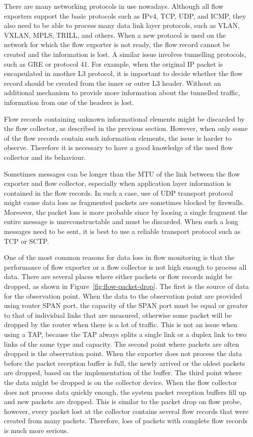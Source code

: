 There are many networking protocols in use nowadays. Although all flow exporters support the basic protocols such as IPv4, TCP, UDP, and ICMP, they also need to be able to process many data link layer protocols, such as VLAN, VXLAN, MPLS, TRILL, and others. When a new protocol is used on the network for which the flow exporter is not ready, the flow record cannot be created and the information is lost. A similar issue involves tunnelling protocols, such as GRE or protocol 41. For example, when the original IP packet is encapsulated in another L3 protocol, it is important to decide whether the flow record should be created from the inner or outer L3 header. Without an additional mechanism to provide more information about the tunnelled traffic, information from one of the headers is lost.

Flow records containing unknown informational elements might be discarded by the flow collector, as described in the previous section. However, when only some of the flow records contain such information elements, the issue is harder to observe. Therefore it is necessary to have a good knowledge of the used flow collector and its behaviour.

Sometimes messages can be longer than the MTU of the link between the flow exporter and flow collector, especially when application layer information is contained in the flow records. In such a case, use of UDP transport protocol might cause data loss as fragmented packets are sometimes blocked by firewalls. Moreover, the packet loss is more probable since by loosing a single fragment the entire message is unreconstructable and must be discarded. When such a long messages need to be sent, it is best to use a reliable transport protocol such as TCP or SCTP.

One of the most common reasons for data loss in flow monitoring is that the performance of flow exporter or a flow collector is not high enough to process all data. There are several places where either packets or flow records might be dropped, as shown in Figure~\ref{fig:flow-packet-drop}. The first is the source of data for the observation point. When the data to the observation point are provided using router SPAN port, the capacity of the SPAN port must be equal or greater to that of individual links that are measured, otherwise some packet will be dropped by the router when there is a lot of traffic. This is not an issue when using a TAP, because the TAP always splits a single link or a duplex link to two links of the same type and capacity. The second point where packets are often dropped is the observation point. When the exporter does not process the data before the packet reception buffer is full, the newly arrived or the oldest packets are dropped, based on the implementation of the buffer. The third point where the data might be dropped is on the collector device. When the flow collector does not process data quickly enough, the system packet reception buffers fill up and new packets are dropped. This is similar to the packet drop on flow probe, however, every packet lost at the collector contains several flow records that were created from many packets. Therefore, loss of packets with complete flow records is much more serious.

